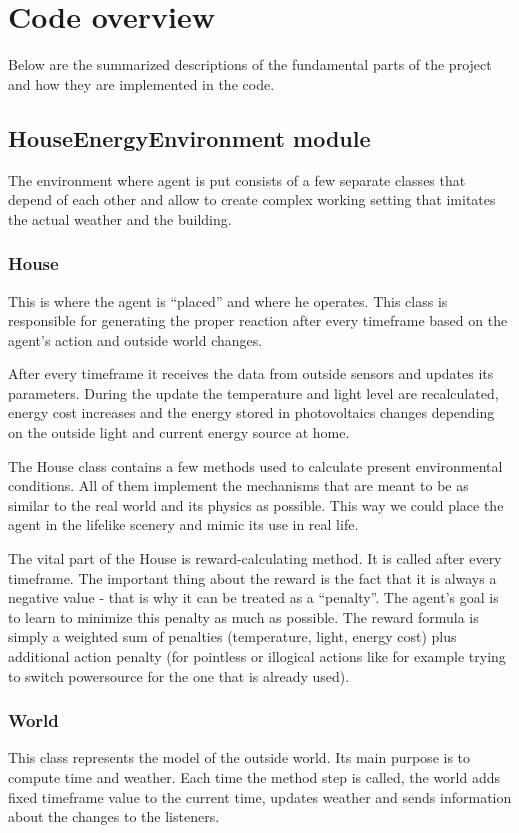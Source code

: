 \documentclass{article}
\begin{document}
\section{Code overview}
Below are the summarized descriptions of the fundamental parts of the project and how they are implemented in the code.
\subsection{HouseEnergyEnvironment module}
The environment where agent is put consists of a few separate classes that depend of each other and allow to create complex working setting that imitates the actual weather and the building.
\subsubsection{House}
This is where the agent is “placed” and where he operates. This class is responsible for generating the proper reaction after every timeframe based on the agent’s action and outside world changes.

After every timeframe it receives the data from outside sensors and updates its parameters. During the update the temperature and light level are recalculated, energy cost increases and the energy stored in photovoltaics changes depending on the outside light and current energy source at home.

The House class contains a few methods used to calculate present environmental conditions. All of them implement the mechanisms that are meant to be as similar to the real world and its physics as possible. This way we could place the agent in the lifelike scenery and mimic its use in real life.

The vital part of the House is reward-calculating method. It is called after every timeframe. The important thing about the reward is the fact that it is always a negative value - that is why it can be treated as a “penalty”. The agent’s goal is to learn to minimize this penalty as much as possible. The reward formula is simply a weighted sum of penalties (temperature, light, energy cost) plus additional action penalty (for pointless or illogical actions like for example trying to switch powersource for the one that is already used). 

\subsubsection{World}
This class represents the model of the outside world. Its main purpose is to compute time and weather. Each time the method step is called, the world adds fixed timeframe value to the current time, updates weather and sends information about the changes to the listeners.
\end{document}
